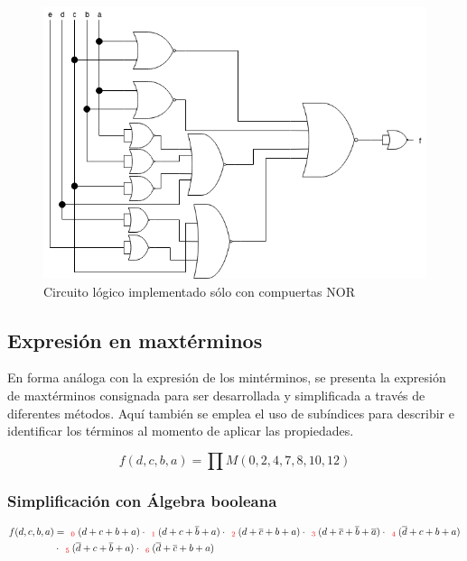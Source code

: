 \begin{figure}[H]
    \centering
    \includegraphics[scale=0.5]{EJ_2/resources/ej_2_minterms_1.png}
    \caption{Circuito l\'ogico implementado s\'olo con compuertas NOR}
\end{figure}

\subsection{Expresi\'on en maxt\'erminos}
En forma an\'aloga con la expresi\'on de los mint\'erminos, se presenta la expresi\'on de maxt\'erminos consignada para ser
desarrollada y simplificada a trav\'es de diferentes m\'etodos. Aqu\'i tambi\'en se emplea el uso de sub\'indices para describir
e identificar los t\'erminos al momento de aplicar las propiedades.

\begin{equation*}
    f(d,c,b,a) = \prod M(0,2,4,7,8,10,12)
\end{equation*}

\subsubsection{Simplificación con Álgebra booleana}

\begin{align*}
f(d,c,b,a) & = _{\ \ \color{red} 0} {(d+c+b+a)}
\cdot _{\ \ \color{red} 1} {(d+c+\overline{b}+a)}
\cdot _{\ \ \color{red} 2} {(d+\overline{c}+b+a)}
\cdot _{\ \ \color{red} 3} {(d+\overline{c}+\overline{b}+\overline{a})}
\cdot _{\ \ \color{red} 4} {(\overline{d}+c+b+a)} \\
& \cdot _{\ \ \color{red} 5} {(\overline{d}+c+\overline{b}+a)}
\cdot _{\ \ \color{red} 6} {(\overline{d}+\overline{c}+b+a)}
\end{align*}

